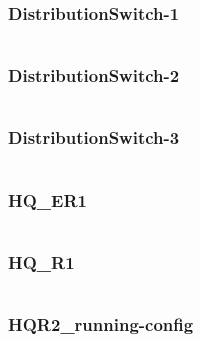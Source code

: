 \subsubsection{DistributionSwitch-1} \label{configwlc}
\inputminted[fontsize=\tiny,linenos,breaklines]{text}{./Config/HQ/DistributionSwitch-1.txt}
\subsubsection{DistributionSwitch-2} \label{configwlc}
\inputminted[fontsize=\tiny,linenos,breaklines]{text}{./Config/HQ/DistributionSwitch-2.txt}
\subsubsection{DistributionSwitch-3} \label{configwlc}
\inputminted[fontsize=\tiny,linenos,breaklines]{text}{./Config/HQ/DistributionSwitch-3.txt}
\subsubsection{HQ\_ER1} \label{configwlc}
\inputminted[fontsize=\tiny,linenos,breaklines]{text}{./Config/HQ/HQ-ER1.txt}
\subsubsection{HQ\_R1} \label{configwlc}
\inputminted[fontsize=\tiny,linenos,breaklines]{text}{./Config/HQ/HQ-R1.txt}
\subsubsection{HQR2\_running-config} \label{configwlc}
\inputminted[fontsize=\tiny,linenos,breaklines]{text}{./Config/HQ/HQR2-running-config.txt}




